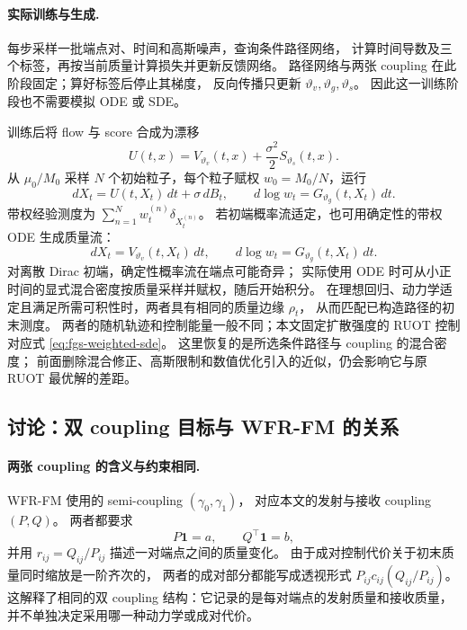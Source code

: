 \documentclass[UTF8,a4paper,11pt,fontset=fandol]{ctexart}
\begin{document}
\paragraph{实际训练与生成.}
每步采样一批端点对、时间和高斯噪声，查询条件路径网络，
计算时间导数及三个标签，再按当前质量计算损失并更新反馈网络。
路径网络与两张 coupling 在此阶段固定；算好标签后停止其梯度，
反向传播只更新 $\vartheta_v,\vartheta_g,\vartheta_s$。
因此这一训练阶段也不需要模拟 ODE 或 SDE。

训练后将 flow 与 score 合成为漂移
\begin{equation}
U(t,x)=V_{\vartheta_v}(t,x)+\frac{\sigma^2}{2}S_{\vartheta_s}(t,x).
\end{equation}
从 $\mu_0/M_0$ 采样 $N$ 个初始粒子，每个粒子赋权 $w_0=M_0/N$，运行
\begin{equation}
dX_t=U(t,X_t)\,dt+\sigma\,dB_t,\qquad
d\log w_t=G_{\vartheta_g}(t,X_t)\,dt.
\label{eq:fgs-weighted-sde}
\end{equation}
带权经验测度为 $\sum_{n=1}^Nw_t^{(n)}\delta_{X_t^{(n)}}$。
若初端概率流适定，也可用确定性的带权 ODE 生成质量流：
\begin{equation}
dX_t=V_{\vartheta_v}(t,X_t)\,dt,\qquad
d\log w_t=G_{\vartheta_g}(t,X_t)\,dt.
\label{eq:fgs-weighted-ode}
\end{equation}
对离散 Dirac 初端，确定性概率流在端点可能奇异；
实际使用 ODE 时可从小正时间的显式混合密度按质量采样并赋权，随后开始积分。
在理想回归、动力学适定且满足所需可积性时，两者具有相同的质量边缘 $\rho_t$，
从而匹配已构造路径的初末测度。
两者的随机轨迹和控制能量一般不同；本文固定扩散强度的 RUOT 控制对应式
\eqref{eq:fgs-weighted-sde}。
这里恢复的是所选条件路径与 coupling 的混合密度；
前面删除混合修正、高斯限制和数值优化引入的近似，仍会影响它与原 RUOT 最优解的差距。

\clearpage
\subsection*{讨论：双 coupling 目标与 WFR-FM 的关系}

\paragraph{两张 coupling 的含义与约束相同.}
WFR-FM 使用的 semi-coupling $(\gamma_0,\gamma_1)$，
对应本文的发射与接收 coupling $(P,Q)$。
两者都要求
\begin{equation}
P\mathbf1=a,\qquad Q^\top\mathbf1=b,
\end{equation}
并用 $r_{ij}=Q_{ij}/P_{ij}$ 描述一对端点之间的质量变化。
由于成对控制代价关于初末质量同时缩放是一阶齐次的，
两者的成对部分都能写成透视形式 $P_{ij}c_{ij}(Q_{ij}/P_{ij})$。
这解释了相同的双 coupling 结构：它记录的是每对端点的发射质量和接收质量，
并不单独决定采用哪一种动力学或成对代价。
\end{document}
